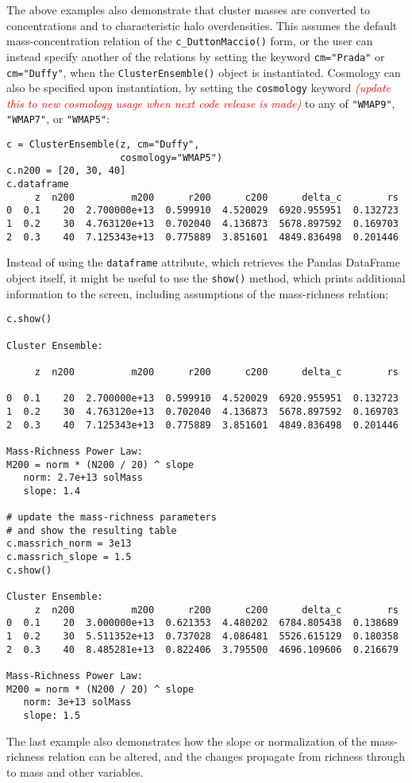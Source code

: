 \documentclass[twocolumn]{aastex6}
\newcommand{\code}{\lstinline[style=codeintext]}
\newcommand{\attn}[2][red]{\textcolor{#1}{\textit{#2}}}
\begin{document}
The above examples also demonstrate that cluster masses are converted to concentrations and to characteristic halo overdensities. This assumes the default mass-concentration relation of the \code{c_DuttonMaccio()} form, or the user can instead specify another of the relations by setting the keyword \code{cm="Prada"} or \code{cm="Duffy"}, when the \code{ClusterEnsemble()} object is instantiated. Cosmology can also be specified upon instantiation, by setting the \code{cosmology} keyword \attn{(update this to new cosmology usage when next code release is made)} to any of \code{"WMAP9"}, \code{"WMAP7"}, or \code{"WMAP5"}:
\begin{lstlisting}
c = ClusterEnsemble(z, cm="Duffy", 
                    cosmology="WMAP5")
c.n200 = [20, 30, 40]
c.dataframe
     z  n200          m200      r200      c200      delta_c        rs
0  0.1    20  2.700000e+13  0.599910  4.520029  6920.955951  0.132723
1  0.2    30  4.763120e+13  0.702040  4.136873  5678.897592  0.169703
2  0.3    40  7.125343e+13  0.775889  3.851601  4849.836498  0.201446
\end{lstlisting}
Instead of using the \code{dataframe} attribute, which retrieves the Pandas DataFrame object itself, it might be useful to use the \code{show()} method, which prints additional information to the screen, including assumptions of the mass-richness relation:
\begin{lstlisting}
c.show()

Cluster Ensemble:

     z  n200          m200      r200      c200      delta_c        rs

0  0.1    20  2.700000e+13  0.599910  4.520029  6920.955951  0.132723
1  0.2    30  4.763120e+13  0.702040  4.136873  5678.897592  0.169703
2  0.3    40  7.125343e+13  0.775889  3.851601  4849.836498  0.201446

Mass-Richness Power Law:
M200 = norm * (N200 / 20) ^ slope
   norm: 2.7e+13 solMass
   slope: 1.4

# update the mass-richness parameters
# and show the resulting table
c.massrich_norm = 3e13
c.massrich_slope = 1.5
c.show()

Cluster Ensemble:
     z  n200          m200      r200      c200      delta_c        rs
0  0.1    20  3.000000e+13  0.621353  4.480202  6784.805438  0.138689
1  0.2    30  5.511352e+13  0.737028  4.086481  5526.615129  0.180358
2  0.3    40  8.485281e+13  0.822406  3.795500  4696.109606  0.216679

Mass-Richness Power Law:
M200 = norm * (N200 / 20) ^ slope
   norm: 3e+13 solMass
   slope: 1.5

\end{lstlisting}
The last example also demonstrates how the slope or normalization of the mass-richness relation can be altered, and the changes propagate from richness through to mass and other variables.
\end{document}
